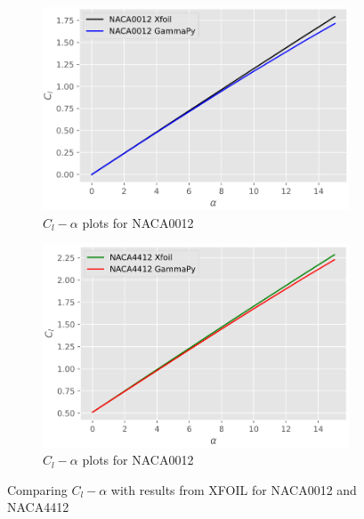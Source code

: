 \begin{figure}[h]
  \centering
  \begin{subfigure}{.5\textwidth}
    \centering
    \captionsetup{width=.8\linewidth}
    \includegraphics[width=.9\linewidth]{static/naca0012_cl_verif.png}
    \caption{\centering $C_l - \alpha$ plots for NACA0012}
    \label{fig:cl_thick_0012}
  \end{subfigure}\hfill%
  \begin{subfigure}{.5\textwidth}
    \centering
    \captionsetup{width=.9\linewidth}
    \includegraphics[width=.9\linewidth]{static/naca4412_cl_verif.png}
    \caption{\centering $C_l - \alpha$ plots for NACA0012}
    \label{fig:cl_thick_4412}
  \end{subfigure}
  \caption{\centering Comparing  $C_l - \alpha$ with results from XFOIL for NACA0012 and NACA4412}
  \label{fig:cl_thick}
\end{figure}

